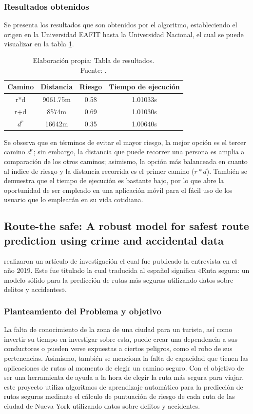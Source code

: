 \subsubsection{Resultados obtenidos}
Se presenta los resultados que son obtenidos por el algoritmo, estableciendo el origen en la Universidad EAFIT hasta la Universidad Nacional, el cual se puede visualizar en la tabla \ref{tab:results}.%

\begin{table}[h]
	\centering
	\begin{tabular}{c|c|c|c}
		Camino & Distancia & Riesgo & Tiempo de ejecución\\\hline
		r*d & 9061.75m & 0.58& 1.01033s\\
		r+d & 8574m& 0.69& 1.01030s\\
		$d^r$& 16642m& 0.35& 1.00640s
	\end{tabular}
	\caption{\label{tab:results}Elaboración propia: Tabla de resultados.\\
		Fuente: \citep*{pr_areiza}. }
\end{table}


Se observa que en términos de evitar el mayor riesgo, la mejor opción es el tercer camino $d^r$; sin embargo, la distancia que puede recorrer una persona es amplia a comparación de los otros caminos; asimismo, la opción más balanceada en cuanto al índice de riesgo y la distancia recorrida es el primer camino ($r*d$). También se demuestra que el tiempo de ejecución es bastante bajo, por lo que abre la oportunidad de ser empleado en una aplicación móvil para el fácil uso de los usuario que lo emplearán en su vida cotidiana.


\subsection{Route-the safe: A robust model for safest route prediction using crime and accidental data \citep*{pr_Soni}}
\citeauthor{pr_Soni} realizaron un artículo de investigación el cual fue publicado la entrevista en el año 2019. Este fue titulado  la cual traducida al español significa «Ruta segura: un modelo sólido para la predicción de rutas más seguras utilizando datos sobre delitos y accidentes».

\subsubsection{Planteamiento del Problema y objetivo }
La falta de conocimiento de la zona de una ciudad para un turista, así como invertir su tiempo en investigar sobre esta, puede crear una dependencia a sus conductores o pueden verse expuestas a ciertos peligros, como el robo de sus pertenencias. Asimismo, también se menciona la falta de capacidad que tienen las aplicaciones de rutas al momento de elegir un camino seguro. Con el objetivo de ser una herramienta de ayuda a la hora de elegir la ruta más segura para viajar, este proyecto  utiliza algoritmos de aprendizaje automático para la predicción de rutas seguras mediante el cálculo de puntuación de riesgo de cada ruta de las ciudad de Nueva York utilizando datos sobre delitos y accidentes.
